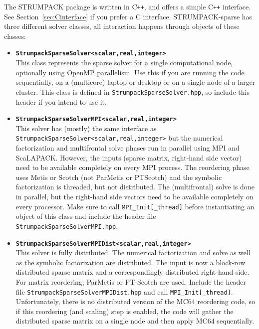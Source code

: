 \documentclass{article}
\begin{document}
The STRUMPACK package is written in C\texttt{++}, and offers
a simple C\texttt{++} interface. See Section~\ref{sec:Cinterface} if
you prefer a C interface. STRUMPACK-sparse has three different solver
classes, all interaction happens through objects of these classes:
\begin{itemize}
\item \textbf{\lstinline[style=C]!StrumpackSparseSolver<scalar,real,integer>!}\\
  This class represents the sparse solver for a single computational
  node, optionally using OpenMP parallelism. Use this if you are
  running the code sequentially, on a (multicore) laptop or desktop or
  on a single node of a larger cluster. This class is defined in
  \lstinline[style=Bash]!StrumpackSparseSolver.hpp!, so include this
  header if you intend to use it.
\item \textbf{\lstinline[style=C]!StrumpackSparseSolverMPI<scalar,real,integer>!}\\
  This solver has (mostly) the same interface as
  \lstinline[style=C]!StrumpackSparseSolver<scalar,real,integer>!  but
  the numerical factorization and multifrontal solve phases run in
  parallel using MPI and ScaLAPACK. However, the inputs (sparse
  matrix, right-hand side vector) need to be available completely on
  every MPI process. The reordering phase uses Metis or Scotch (not
  ParMetis or PTScotch) and the symbolic factorization is threaded,
  but not distributed. The (multifrontal) solve is done in parallel,
  but the right-hand side vectors need to be available completely on
  every processor. Make sure to call
  \lstinline[style=C]!MPI_Init[_thread]!  before instantiating an
  object of this class and include the header file
  \lstinline[style=Bash]!StrumpackSparseSolverMPI.hpp!.
\item
  \textbf{\lstinline[style=C]!StrumpackSparseSolverMPIDist<scalar,real,integer>!}\\
  This solver is fully distributed. The numerical factorization and
  solve as well as the symbolic factorization are distributed. The
  input is now a block-row distributed sparse matrix and a
  correspondingly distributed right-hand side. For matrix reordering,
  ParMetis or PT-Scotch are used. Include the header file
  \lstinline[style=Bash]!StrumpackSparseSolverMPIDist.hpp! and call
  \lstinline[style=C]!MPI_Init[_thread]!. Unfortunately, there is no
  distributed version of the MC64 reordering code, so if this
  reordering (and scaling) step is enabled, the code will gather the
  distributed sparse matrix on a single node and then apply MC64
  sequentially.
\end{itemize}
\end{document}
